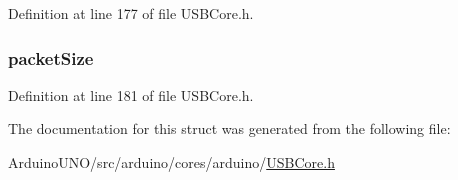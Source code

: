 Definition at line 177 of file U\+S\+B\+Core.\+h.

\hypertarget{struct_endpoint_descriptor_a198c21ff91822a72041d63f054615143}{}
\subsubsection[{packet\+Size}]{ packet\+Size}\label{struct_endpoint_descriptor_a198c21ff91822a72041d63f054615143}


Definition at line 181 of file U\+S\+B\+Core.\+h.



The documentation for this struct was generated from the following file\+:\begin{DoxyCompactItemize}
\item 
Arduino\+U\+N\+O/src/arduino/cores/arduino/\hyperlink{_u_s_b_core_8h}{U\+S\+B\+Core.\+h}\end{DoxyCompactItemize}
